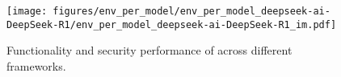 
\begin{figure}[h]
    \centering
    \texttt{[image: figures/env\_per\_model/env\_per\_model\_deepseek-ai-DeepSeek-R1/env\_per\_model\_deepseek-ai-DeepSeek-R1\_im.pdf]}
    \caption{Functionality and security performance of \dsro{} across different frameworks.}
    \label{fig:env_per_model_deepseek-ai-DeepSeek-R1}
\end{figure}
